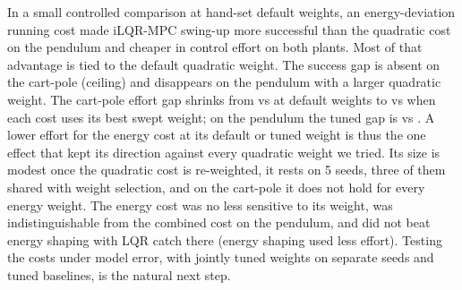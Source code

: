 In a small controlled comparison at hand-set default weights, an energy-deviation running cost made iLQR-MPC swing-up more successful than the quadratic cost on the pendulum and cheaper in control effort on both plants. Most of that advantage is tied to the default quadratic weight. The success gap is absent on the cart-pole (ceiling) and disappears on the pendulum with a larger quadratic weight. The cart-pole effort gap shrinks from  vs  at default weights to  vs  when each cost uses its best swept weight; on the pendulum the tuned gap is  vs . A lower effort for the energy cost at its default or tuned weight is thus the one effect that kept its direction against every quadratic weight we tried. Its size is modest once the quadratic cost is re-weighted, it rests on 5 seeds, three of them shared with weight selection, and on the cart-pole it does not hold for every energy weight. The energy cost was no less sensitive to its weight, was indistinguishable from the combined cost on the pendulum, and did not beat energy shaping with LQR catch there (energy shaping used less effort). Testing the costs under model error, with jointly tuned weights on separate seeds and tuned baselines, is the natural next step.

